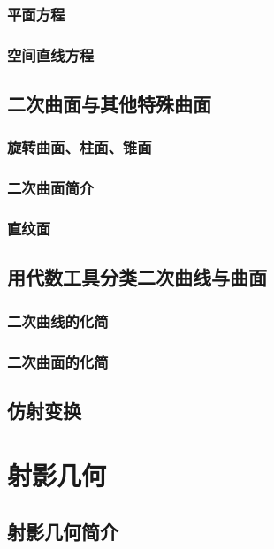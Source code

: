 \subsection{平面方程}
\clearpage
\subsection{空间直线方程}
\clearpage



\section{二次曲面与其他特殊曲面}
\subsection{旋转曲面、柱面、锥面}
\clearpage
\subsection{二次曲面简介}
\clearpage
\subsection{直纹面}
\clearpage

\section{用代数工具分类二次曲线与曲面}
\subsection{二次曲线的化简}
\clearpage

\subsection{二次曲面的化简}
\clearpage

\section{仿射变换}%
\clearpage



\chapter{射影几何}
\section{射影几何简介}
\clearpage